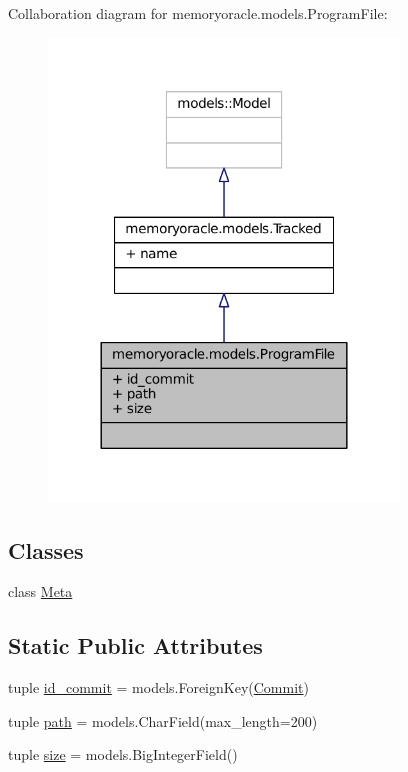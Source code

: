 Collaboration diagram for memoryoracle.\+models.\+Program\+File\+:\nopagebreak
\begin{figure}[H]
\begin{center}
\leavevmode
\includegraphics[width=264pt]{classmemoryoracle_1_1models_1_1ProgramFile__coll__graph}
\end{center}
\end{figure}
\subsection*{Classes}
\begin{DoxyCompactItemize}
\item 
class \hyperlink{classmemoryoracle_1_1models_1_1ProgramFile_1_1Meta}{Meta}
\end{DoxyCompactItemize}
\subsection*{Static Public Attributes}
\begin{DoxyCompactItemize}
\item 
tuple \hyperlink{classmemoryoracle_1_1models_1_1ProgramFile_a043ca59562f8a3e9895a1b1fa54fb112}{id\+\_\+commit} = models.\+Foreign\+Key(\hyperlink{classmemoryoracle_1_1models_1_1Commit}{Commit})
\item 
tuple \hyperlink{classmemoryoracle_1_1models_1_1ProgramFile_a7a0ec571a959e879f3dde8d10907e6cb}{path} = models.\+Char\+Field(max\+\_\+length=200)
\item 
tuple \hyperlink{classmemoryoracle_1_1models_1_1ProgramFile_a81df4da5004a89d6d07ad8d104a67e56}{size} = models.\+Big\+Integer\+Field()
\end{DoxyCompactItemize}


